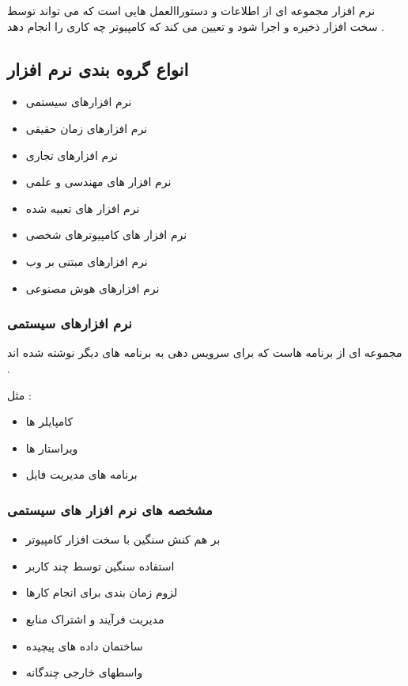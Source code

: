 \documentclass[12pt]{book}
\begin{document}
نرم افزار مجموعه ای از اطلاعات و دستوراالعمل هایی است که می تواند توسط سخت افزار ذخیره و اجرا شود و تعیین می کند که کامپیوتر چه کاری را انجام دهد .


\subsection{انواع گروه بندی نرم افزار}

\begin{itemize}
	\item نرم افزارهای سیستمی
	\item نرم افزارهای زمان حقیقی
	\item نرم افزارهای تجاری
	\item نرم افزار های مهندسی و علمی
	\item نرم افزار های تعبیه شده
	\item نرم افزار های کامپیوترهای شخصی
	\item نرم افزارهای مبتنی بر وب
	\item نرم افزارهای هوش مصنوعی
\end{itemize}


\subsubsection{نرم افزارهای سیستمی}
مجموعه ای از برنامه هاست که برای سرویس دهی به برنامه های دیگر نوشته شده اند .

 مثل : 
\begin{itemize}
	\item کامپایلر ها
	\item ویراستار ها
	\item برنامه های مدیریت فایل
\end{itemize}


\subsubsection{مشخصه های نرم افزار های سیستمی}

\begin{itemize}
	\item بر هم کنش سنگین با سخت افزار کامپیوتر
	\item استفاده سنگین توسط چند کاربر
	\item لزوم زمان بندی برای انجام کارها
	\item مدیریت فرآیند و اشتراک منابع
	\item ساختمان داده های پیچیده
	\item واسطهای خارجی چندگانه
\end{itemize}
\end{document}
